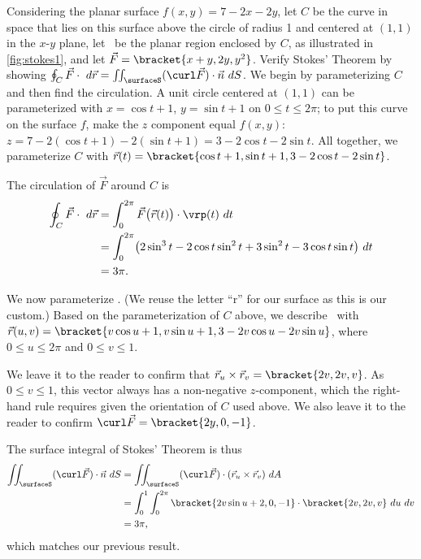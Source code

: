\begin{example}\label{ex_stokes1}
Considering the planar surface $f(x,y) = 7-2x-2y$, let $C$ be the curve in space that lies on this surface above the circle of radius 1 and centered at $(1,1)$ in the $x$-$y$ plane, let \surfaceS\ be the planar region enclosed by $C$, as illustrated in \autoref{fig:stokes1}, and let $\vec F =\bracket{x+y,2y, y^2}$. Verify Stokes' Theorem by showing $\oint_C \vec F\cdot \ d\vec r = \iint_\surfaceS (\curl\vec F)\cdot \vec n\ dS$.
\solution
We begin by parameterizing $C$ and then find the circulation. A unit circle centered at $(1,1)$ can be parameterized with $x=\cos t+1$, $y=\sin t+1$ on $0\leq t\leq 2\pi$; to put this curve on the surface $f$, make the $z$ component equal $f(x,y)$: $z = 7-2(\cos t+1)-2(\sin t+1)  = 3-2\cos t - 2\sin t$. All together, we parameterize $C$ with $\vec r(t) =\bracket{\cos t+1, \sin t+1, 3-2\cos t-2\sin t}$. 

The circulation of $\vec F$ around $C$ is
\begin{align*}
	\oint_C\vec F\cdot \ d\vec r
	&= \int_0^{2\pi}\vec F\bigl(\vec r(t)\bigr)\cdot \vrp(t)\ dt \\
	&= \int_0^{2\pi}\bigl(2\sin^3t-2\cos t\sin^2t+3\sin^2t-3\cos t\sin t\bigr)\ dt \\
	&= 3\pi.
\end{align*}

We now parameterize \surfaceS. (We reuse the letter ``r'' for our surface as this is our custom.) Based on the parameterization of $C$ above, we describe \surfaceS\ with $\vec r(u,v) =\bracket{v\cos u+1, v\sin u+1, 3-2v\cos u-2v\sin u}$, where $0\leq u\leq 2\pi$ and $0\leq v\leq 1$. 

We leave it to the reader to confirm that $\vec r_u\times \vec r_v =\bracket{2v,2v,v}$. As $0\leq v\leq 1$, this vector always has a non-negative $z$-component, which the right-hand rule requires given the orientation of $C$ used above. We also leave it to the reader to confirm $\curl\vec F =\bracket{2y,0,-1}$.

The surface integral of Stokes' Theorem is thus
\begin{align*}
	\iint_\surfaceS (\curl\vec F)\cdot \vec n\ dS
	&= \iint_\surfaceS (\curl\vec F)\cdot (\vec r_u\times \vec r_v)\ dA \\
	&= \int_0^1\int_0^{2\pi}\bracket{2v\sin u+2,0,-1}\cdot\bracket{2v,2v,v}\ du\ dv\\
	&= 3\pi,
\end{align*}
which matches our previous result.
\end{example}

